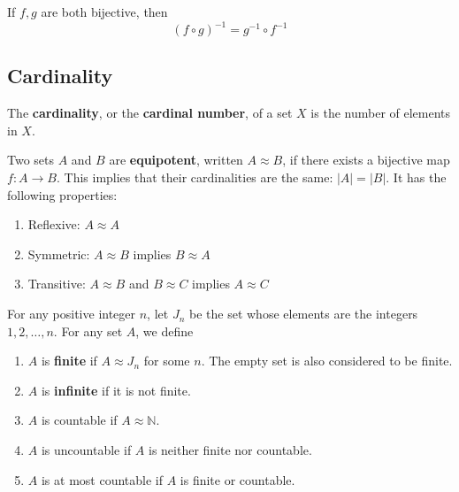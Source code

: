 \documentclass{article}
\begin{document}
    \begin{theorem}
      If $f, g$ are both bijective, then 
      \begin{equation}
        (f \circ g)^{-1} = g^{-1} \circ f^{-1}
      \end{equation}
    \end{theorem}

  \subsection{Cardinality}

    \begin{definition}[Cardinality]
      The \textbf{cardinality}, or the \textbf{cardinal number}, of a set $X$ is the number of elements in $X$. 
    \end{definition} 

    \begin{definition}[Equipotence]
      Two sets $A$ and $B$ are \textbf{equipotent}, written $A \approx B$, if there exists a bijective map $f: A \rightarrow B$. This implies that their cardinalities are the same: $|A| = |B|$. It has the following properties: 
      \begin{enumerate}
        \item Reflexive: $A \approx A$
        \item Symmetric: $A \approx B$ implies $B \approx A$
        \item Transitive: $A \approx B$ and $B \approx C$ implies $A \approx C$
      \end{enumerate}
    \end{definition}

    \begin{definition}
      For any positive integer $n$, let $J_n$ be the set whose elements are the integers $1, 2, \ldots, n$. For any set $A$, we define 
      \begin{enumerate}
        \item $A$ is \textbf{finite} if $A \approx J_n$ for some $n$. The empty set is also considered to be finite. 
        \item $A$ is \textbf{infinite} if it is not finite. 
        \item $A$ is countable if $A \approx \mathbb{N}$. 
        \item $A$ is uncountable if $A$ is neither finite nor countable. 
        \item $A$ is at most countable if $A$ is finite or countable. 
      \end{enumerate}
    \end{definition}
\end{document}

